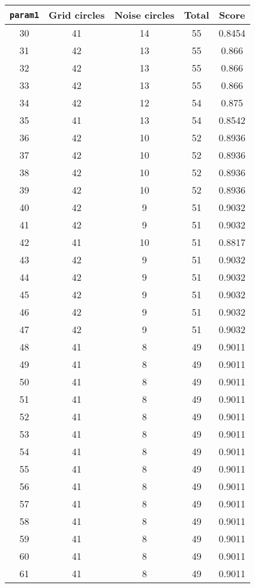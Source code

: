 \documentclass[letterpaper, 12pt]{article}
\begin{document}
\begin{longtable}{|c|c|c|c|c|}
\hline
\textbf{\texttt{param1}} & \textbf{Grid circles} & \textbf{Noise circles} & \textbf{Total} & \textbf{Score} \\
\hline
30 & 41 & 14 & 55 & 0.8454 \\
\hline
31 & 42 & 13 & 55 & 0.866 \\
\hline
32 & 42 & 13 & 55 & 0.866 \\
\hline
33 & 42 & 13 & 55 & 0.866 \\
\hline
34 & 42 & 12 & 54 & 0.875 \\
\hline
35 & 41 & 13 & 54 & 0.8542 \\
\hline
36 & 42 & 10 & 52 & 0.8936 \\
\hline
37 & 42 & 10 & 52 & 0.8936 \\
\hline
38 & 42 & 10 & 52 & 0.8936 \\
\hline
39 & 42 & 10 & 52 & 0.8936 \\
\hline
40 & 42 & 9 & 51 & 0.9032 \\
\hline
41 & 42 & 9 & 51 & 0.9032 \\
\hline
42 & 41 & 10 & 51 & 0.8817 \\
\hline
43 & 42 & 9 & 51 & 0.9032 \\
\hline
44 & 42 & 9 & 51 & 0.9032 \\
\hline
45 & 42 & 9 & 51 & 0.9032 \\
\hline
46 & 42 & 9 & 51 & 0.9032 \\
\hline
47 & 42 & 9 & 51 & 0.9032 \\
\hline
48 & 41 & 8 & 49 & 0.9011 \\
\hline
49 & 41 & 8 & 49 & 0.9011 \\
\hline
50 & 41 & 8 & 49 & 0.9011 \\
\hline
51 & 41 & 8 & 49 & 0.9011 \\
\hline
52 & 41 & 8 & 49 & 0.9011 \\
\hline
53 & 41 & 8 & 49 & 0.9011 \\
\hline
54 & 41 & 8 & 49 & 0.9011 \\
\hline
55 & 41 & 8 & 49 & 0.9011 \\
\hline
56 & 41 & 8 & 49 & 0.9011 \\
\hline
57 & 41 & 8 & 49 & 0.9011 \\
\hline
58 & 41 & 8 & 49 & 0.9011 \\
\hline
59 & 41 & 8 & 49 & 0.9011 \\
\hline
60 & 41 & 8 & 49 & 0.9011 \\
\hline
61 & 41 & 8 & 49 & 0.9011 \\

\end{longtable}
\end{document}
